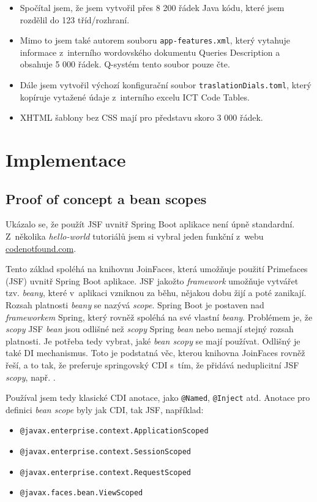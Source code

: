 \documentclass[thesis=M,czech]{FITthesis}[2019/12/23]
\begin{document}
\begin{itemize}
	\item Spočítal jsem, že jsem vytvořil přes 8 200 řádek Java kódu, které jsem rozdělil do 123 tříd\slash rozhraní.
	\item Mimo to jsem také autorem souboru \texttt{app-features.xml}, který vytahuje informace z~interního wordovského dokumentu Queries Description a obsahuje 5 000 řádek. Q-systém tento soubor pouze čte. \cite{Queries}
	\item Dále jsem vytvořil výchozí konfigurační soubor \texttt{traslationDials.toml}, který kopíruje vytažené údaje z~interního excelu ICT Code Tables. \cite{ICT}
	\item XHTML šablony bez CSS mají pro představu skoro 3 000 řádek.
\end{itemize}

\section{Implementace}
\subsection{Proof of concept a bean scopes} 
Ukázalo se, že použít JSF uvnitř Spring Boot aplikace není úpně standardní. Z~několika \textit{hello-world} tutoriálů jsem si vybral jeden funkční z~webu \\\url{codenotfound.com}. \cite{CodeNotFound}

Tento základ spoléhá na knihovnu JoinFaces, která umožňuje použití Primefaces (JSF) uvnitř Spring Boot aplikace. JSF jakožto \textit{framework} umožňuje vytvářet tzv. \textit{beany}, které v~aplikaci vzniknou za běhu, nějakou dobu žijí a poté zanikají. Rozsah platnosti \textit{beany} se nazývá \textit{scope}. Spring Boot je postaven nad \textit{frameworkem} Spring, který rovněž spoléhá na své vlastní \textit{beany}. Problémem je, že \textit{scopy} JSF \textit{bean} jsou odlišné než \textit{scopy} Spring \textit{bean} nebo nemají stejný rozsah platnosti. Je potřeba tedy vybrat, jaké \textit{bean scopy} se mají používat. Odlišný je také DI mechanismus. Toto je podstatná věc, kterou knihovna JoinFaces rovněž řeší, a to tak, že preferuje springovský CDI s~tím, že přidává neduplicitní JSF \textit{scopy}, např. . \cite{ManagedBeans, CDI, JSFDI}

Používal jsem tedy klasické CDI anotace, jako \texttt{@Named}, \texttt{@Inject} atd. Anotace pro definici \textit{bean scope} byly jak CDI, tak JSF, například: \cite{JoinFaces}
\begin{itemize}
	\item \texttt{@javax.enterprise.context.ApplicationScoped}
	\item \texttt{@javax.enterprise.context.SessionScoped}
	\item \texttt{@javax.enterprise.context.RequestScoped}
	\item \texttt{@javax.faces.bean.ViewScoped}
\end{itemize}
\end{document}
